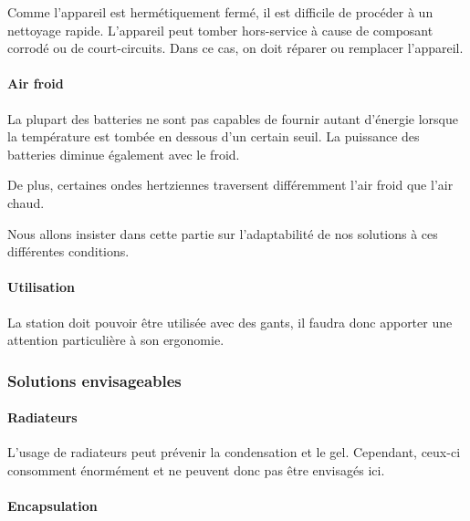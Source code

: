 Comme l'appareil est hermétiquement fermé, il est difficile de procéder à un nettoyage rapide. L'appareil peut tomber hors-service à cause de composant corrodé ou de court-circuits. Dans ce cas, on doit réparer ou remplacer l'appareil.

\paragraph{Air froid}

La plupart des batteries ne sont pas capables de fournir autant d'énergie lorsque la température est tombée en dessous d'un certain seuil. La puissance des batteries diminue également avec le froid.

De plus, certaines ondes hertziennes traversent différemment l'air froid que l'air chaud\footnotemark.


Nous allons insister dans cette partie sur l'adaptabilité de nos solutions à ces différentes conditions.


\paragraph{Utilisation}

La station doit pouvoir être utilisée avec des gants, il faudra donc apporter une attention particulière à son ergonomie.

\subsubsection{Solutions envisageables}

\paragraph{Radiateurs}

L'usage de radiateurs peut prévenir la condensation et le gel. Cependant, ceux-ci consomment énormément et ne peuvent donc pas être envisagés ici.

\paragraph{Encapsulation}

